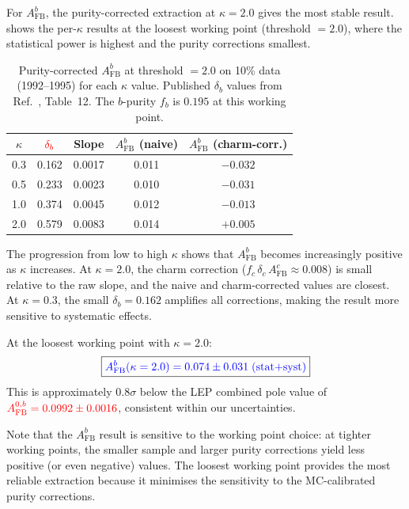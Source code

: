 \documentclass[11pt,a4paper]{article}
\newcommand{\measured}[1]{\textcolor{blue}{#1}}
\newcommand{\external}[1]{\textcolor{red}{#1}}
\begin{document}
For $A_\text{FB}^b$, the purity-corrected extraction at
$\kappa = 2.0$ gives the most stable result.
 shows the per-$\kappa$ results at
the loosest working point (threshold $= 2.0$), where the
statistical power is highest and the purity corrections smallest.

\begin{table}[htbp]
\centering
\caption{Purity-corrected $A_\text{FB}^b$ at threshold $= 2.0$
on 10\% data (1992--1995) for each $\kappa$ value.
Published $\delta_b$ values from
Ref.~\cite{LEP:EWWG:2005}, Table~12.
The $b$-purity $f_b$ is $0.195$ at this working point.}
\label{tbl:afb_per_kappa}
\begin{tabular}{ccccc}
\toprule
$\kappa$ & $\external{\delta_b}$ & Slope &
$A_\text{FB}^b$ (naive) & $A_\text{FB}^b$ (charm-corr.) \\
\midrule
0.3 & 0.162 & 0.0017 & 0.011 & $-0.032$ \\
0.5 & 0.233 & 0.0023 & 0.010 & $-0.031$ \\
1.0 & 0.374 & 0.0045 & 0.012 & $-0.013$ \\
2.0 & 0.579 & 0.0083 & 0.014 & $+0.005$ \\
\bottomrule
\end{tabular}
\end{table}

The progression from low to high $\kappa$ shows that $A_\text{FB}^b$
becomes increasingly positive as $\kappa$ increases.
At $\kappa = 2.0$, the charm correction
($f_c\,\delta_c\,A_\text{FB}^c \approx 0.008$) is small
relative to the raw slope, and the naive and charm-corrected
values are closest.
At $\kappa = 0.3$, the small $\delta_b = 0.162$ amplifies all
corrections, making the result more sensitive to systematic
effects.

At the loosest working point with $\kappa = 2.0$:
\begin{equation}
\boxed{
\measured{A_\text{FB}^b(\kappa = 2.0) = 0.074 \pm 0.031
\;\text{(stat+syst)}}
}
\label{eq:afb_result}
\end{equation}
This is approximately $0.8\sigma$ below the LEP combined pole
value of $\external{A_\text{FB}^{0,b} = 0.0992 \pm 0.0016}$,
consistent within our uncertainties.

Note that the $A_\text{FB}^b$ result is sensitive to the working
point choice: at tighter working points, the smaller sample and
larger purity corrections yield less positive (or even negative)
values.
The loosest working point provides the most reliable extraction
because it minimises the sensitivity to the MC-calibrated purity
corrections.
\end{document}
